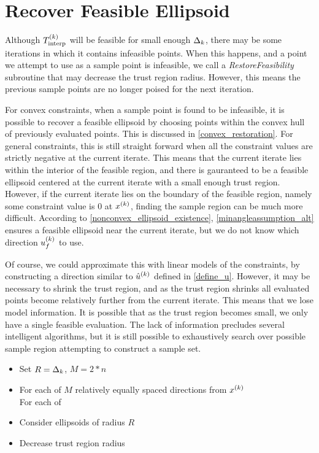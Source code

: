 \section{Recover Feasible Ellipsoid}
\label{recovering_feasiblity_section}

Although ${T_{\text{interp}}^{(k)}}$ will be feasible for small enough $\Delta_k$, there may be some iterations in which it contains infeasible points.
When this happens, and a point we attempt to use as a sample point is infeasible, we call a \emph{RestoreFeasibility} subroutine that may decrease the trust region radius.
However, this means the previous sample points are no longer poised for the next iteration.

For convex constraints, when a sample point is found to be infeasible, it is possible to recover a feasible ellipsoid by choosing points within the convex hull of previously evaluated points.
This is discussed in \cref{convex_restoration}.
For general constraints, this is still straight forward when all the constraint values are strictly negative at the current iterate.
This means that the current iterate lies within the interior of the feasible region,
and there is gauranteed to be a feasible ellipsoid centered at the current iterate with a small enough trust region.
However, if the current iterate lies on the boundary of the feasible region, namely some constraint value is $0$ at $x^{(k)}$, finding the sample region can be much more difficult.
According to \cref{nonconvex_ellipsoid_existence}, \cref{minangleassumption_alt} ensures a feasible ellipsoid near the current iterate,
but we do not know which direction ${u^{(k)}_f}$ to use.

Of course, we could approximate this with linear models of the constraints, by constructing a direction similar to ${{\hat u}^{(k)}}$ defined in \cref{define_u}.
However, it may be necessary to shrink the trust region, and as the trust region shrinks all evaluated points become relatively further from the current iterate.
This means that we lose model information.
It is possible that as the trust region becomes small, we only have a single feasible evaluation.
The lack of information precludes several intelligent algorithms,
but it is still possible to exhaustively search over possible sample region attempting to construct a sample set.

\begin{itemize}
\item Set $R =\Delta_k$, $M = 2*n$
\item For each of $M$ relatively equally spaced directions from $x^{(k)}$ \\
For each of \\
\item Consider ellipsoids of radius $R$
\item Decrease trust region radius
\end{itemize}


